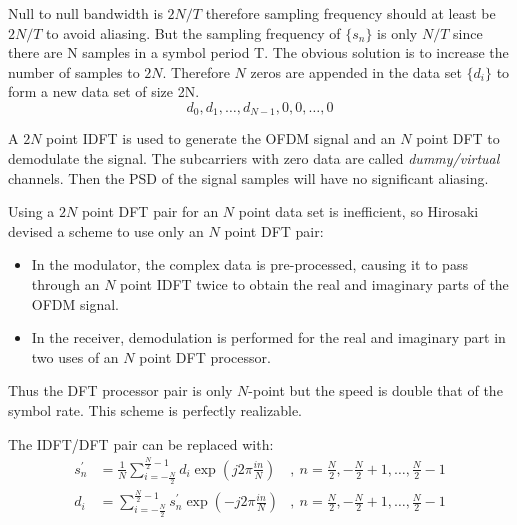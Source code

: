 Null to null bandwidth is $2N/T$ therefore sampling frequency should at least be $2N/T$ to avoid \gls{aliasing}. But the sampling frequency of $\{ s_n\}$ is only $N/T$ since there are N samples in a symbol period T. The obvious solution is to increase the number of samples to $2N$. Therefore $N$ zeros are appended in the data set $\{ d_i\}$ to form a new data set of size 2N.
$$d_0,d_1,\ldots,d_{N-1}, 0,0,\ldots,0$$

A $2N$ point \gls{IDFT} is used to generate the \gls{OFDM} signal and an $N$ point \gls{DFT} to demodulate the signal. The subcarriers with zero data are called \textit{dummy/virtual} channels. Then the \gls{PSD} of the signal samples will have no significant \gls{aliasing}.

Using a $2N$ point \gls{DFT} pair for an $N$ point data set is inefficient, so Hirosaki\cite{hirosaki} devised a scheme to use only an $N$ point \gls{DFT} pair:
\begin{itemize}
	\item In the modulator, the complex data is pre-processed, causing it to pass through an $N$ point \gls{IDFT} twice to obtain the real and imaginary parts of the \gls{OFDM} signal.
	\item In the receiver, demodulation is performed for the real and imaginary part in two uses of an $N$ point \gls{DFT} processor.
\end{itemize}
Thus the \gls{DFT} processor pair is only $N$-point but the speed is double that of the symbol rate. This scheme is perfectly realizable\cite{hirosaki}.

%
The \gls{IDFT}/\gls{DFT} pair can be replaced with:
\begin{align*}
s_n^\prime &= \frac{1}{N}\sum_{i=-\frac{N}{2}}^{\frac{N}{2}-1}d_i\exp\left( j2\pi\frac{in}{N}\right)&,\ n = \frac{N}{2},-\frac{N}{2}+1,\ldots,\frac{N}{2}-1\\
d_i &= \sum_{i=-\frac{N}{2}}^{\frac{N}{2}-1}s_n^\prime\exp\left( -j2\pi\frac{in}{N}\right)&,\ n = \frac{N}{2},-\frac{N}{2}+1,\ldots,\frac{N}{2}-1\\
\end{align*}

